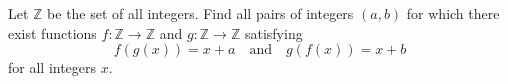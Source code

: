 Let $\mathbb{Z}$ be the set of all integers. Find all pairs of integers $(a,b)$ for which there exist functions $f:\mathbb{Z}\to\mathbb{Z}$ and $g:\mathbb{Z}\to\mathbb{Z}$ satisfying \[f(g(x))=x+a\quad\text{and}\quad g(f(x))=x+b\] for all integers $x$.